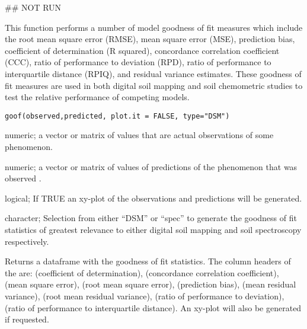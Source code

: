 \documentclass[a4paper]{book}
\begin{document}
%
\begin{Examples}
\begin{ExampleCode}
## NOT RUN


\end{ExampleCode}
\end{Examples}
%
\begin{Description}
This function performs a number of model goodness of fit measures which include the root mean square error (RMSE), mean square error (MSE),  prediction bias, coefficient of determination (R squared), concordance correlation coefficient (CCC), ratio of performance to deviation (RPD), ratio of performance to interquartile distance (RPIQ), and residual variance estimates. These goodness of fit measures are used in both digital soil mapping and soil chemometric studies to test the relative performance of competing models.
\end{Description}
%
\begin{Usage}
\begin{verbatim}
goof(observed,predicted, plot.it = FALSE, type="DSM")
\end{verbatim}
\end{Usage}
%
\begin{Arguments}
\begin{ldescription}
\item[\code{observed}] numeric; a vector or matrix of values that are actual observations of some phenomenon.
\item[\code{predicted}] numeric; a vector or matrix of values of predictions of the phenomenon that was observed .    
\item[\code{plot.it}] logical; If TRUE an xy-plot of the observations and predictions will be generated. 
\item[\code{type}] character; Selection from either ``DSM'' or ``spec'' to generate the goodness of fit statistics of greatest relevance to either digital soil mapping and soil spectroscopy respectively.
\end{ldescription}
\end{Arguments}
%
\begin{Value}
Returns a dataframe with the goodness of fit statistics. The column headers of the  are:  (coefficient of determination),  (concordance correlation coefficient),  (mean square error),  (root mean square error),  (prediction bias),  (mean residual variance),  (root mean residual variance),  (ratio of performance to deviation),  (ratio of performance to interquartile distance). An xy-plot will also be generated if requested. 
\end{Value}
\end{document}
